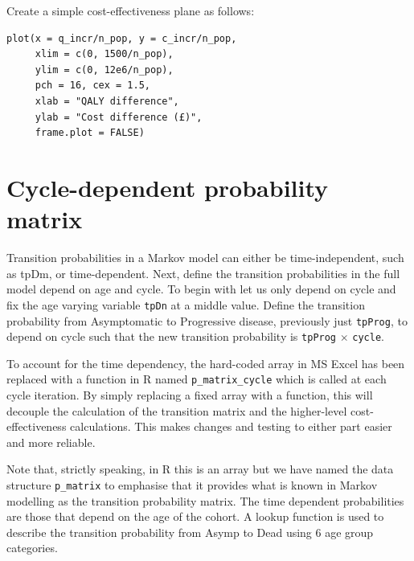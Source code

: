 Create a simple cost-effectiveness plane as follows:

\begin{verbatim}
plot(x = q_incr/n_pop, y = c_incr/n_pop,
     xlim = c(0, 1500/n_pop),
     ylim = c(0, 12e6/n_pop),
     pch = 16, cex = 1.5,
     xlab = "QALY difference",
     ylab = "Cost difference (£)",
     frame.plot = FALSE)
\end{verbatim}

%
\section{Cycle-dependent probability matrix}
Transition probabilities in a Markov model can either be time-independent, such as tpDm, or time-dependent.
Next, define the transition probabilities in the full model depend on age and cycle.
To begin with let us only depend on cycle and fix the age varying variable \texttt{tpDn} at a middle value.
Define the transition probability from Asymptomatic to Progressive disease, previously just \texttt{tpProg}, to depend on cycle such that the new transition probability is \texttt{tpProg} $\times$ \texttt{cycle}.

To account for the time dependency, the hard-coded array in MS Excel has been replaced with a function in R named \texttt{p\_matrix\_cycle} which is called at each cycle iteration. By simply replacing a fixed array with a function, this will decouple the calculation of the transition matrix and the higher-level cost-effectiveness calculations. This makes changes and testing to either part easier and more reliable.

Note that, strictly speaking, in R this is an array but we have named the data structure \texttt{p\_matrix} to emphasise that it provides what is known in Markov modelling as the transition probability matrix. The time dependent probabilities are those that depend on the age of the cohort. A lookup function is used to describe the transition probability from Asymp to Dead using 6 age group categories.

